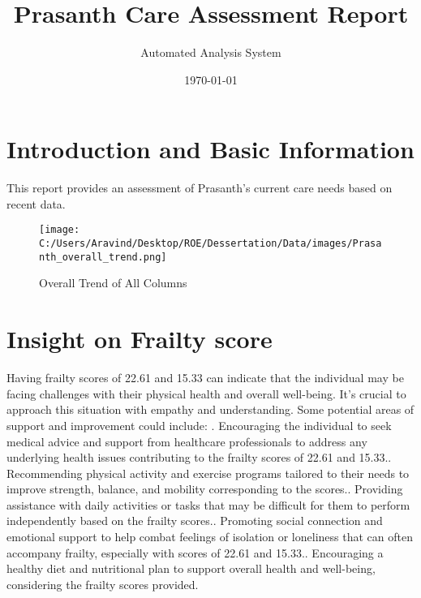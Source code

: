 \documentclass[10pt, a4paper]{article}%
\title{Prasanth Care Assessment Report}%
\author{Automated Analysis System}%
\date{\today}%
\begin{document}
%
\normalsize%
\maketitle%
\section{Introduction and Basic Information}%
\label{sec:IntroductionandBasicInformation}%
This report provides an assessment of Prasanth's current care needs based on recent data.%


\begin{figure}[H]%
\centering%
\texttt{[image: C:/Users/Aravind/Desktop/ROE/Dessertation/Data/images/Prasanth\_overall\_trend.png]}%
\caption{Overall Trend of All Columns}%
\end{figure}

%
\section{Insight on Frailty score}%
\label{sec:InsightonFrailtyscore}%
Having frailty scores of 22.61 and 15.33 can indicate that the individual may be facing challenges with their physical health and overall well{-}being. It's crucial to approach this situation with empathy and understanding.\newline%
\newline%
Some potential areas of support and improvement could include:\newline%
. Encouraging the individual to seek medical advice and support from healthcare professionals to address any underlying health issues contributing to the frailty scores of 22.61 and 15.33.. Recommending physical activity and exercise programs tailored to their needs to improve strength, balance, and mobility corresponding to the scores.. Providing assistance with daily activities or tasks that may be difficult for them to perform independently based on the frailty scores.. Promoting social connection and emotional support to help combat feelings of isolation or loneliness that can often accompany frailty, especially with scores of 22.61 and 15.33.. Encouraging a healthy diet and nutritional plan to support overall health and well{-}being, considering the frailty scores provided.%
\end{document}
